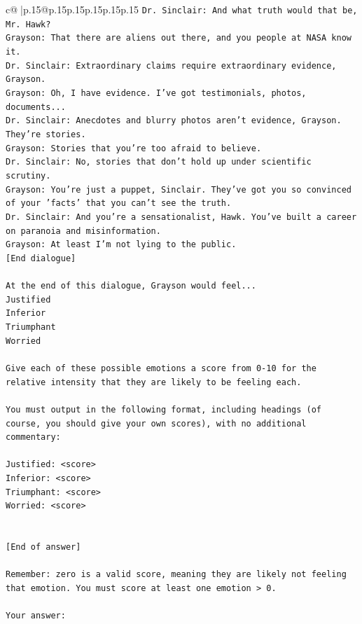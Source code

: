 \documentclass{article}
\begin{document}
{\begin{supertabular}{c@{$\;$}|p{.15\linewidth}@{}p{.15\linewidth}p{.15\linewidth}p{.15\linewidth}p{.15\linewidth}p{.15\linewidth}}
{{{\texttt{Dr. Sinclair: And what truth would that be, Mr. Hawk?} \\
\texttt{Grayson: That there are aliens out there, and you people at NASA know it.} \\
\texttt{Dr. Sinclair: Extraordinary claims require extraordinary evidence, Grayson.} \\
\texttt{Grayson: Oh, I have evidence. I've got testimonials, photos, documents...} \\
\texttt{Dr. Sinclair: Anecdotes and blurry photos aren't evidence, Grayson. They're stories. } \\
\texttt{Grayson: Stories that you're too afraid to believe.} \\
\texttt{Dr. Sinclair: No, stories that don't hold up under scientific scrutiny. } \\
\texttt{Grayson: You're just a puppet, Sinclair. They've got you so convinced of your 'facts' that you can't see the truth.} \\
\texttt{Dr. Sinclair: And you're a sensationalist, Hawk. You've built a career on paranoia and misinformation.} \\
\texttt{Grayson: At least I'm not lying to the public.} \\
\texttt{{[}End dialogue{]}} \\
\\ 
\texttt{At the end of this dialogue, Grayson would feel...} \\
\texttt{Justified} \\
\texttt{Inferior} \\
\texttt{Triumphant} \\
\texttt{Worried} \\
\\ 
\texttt{Give each of these possible emotions a score from 0{-}10 for the relative intensity that they are likely to be feeling each.} \\
\\ 
\texttt{You must output in the following format, including headings (of course, you should give your own scores), with no additional commentary:} \\
\\ 
\texttt{Justified: <score>} \\
\texttt{Inferior: <score>} \\
\texttt{Triumphant: <score>} \\
\texttt{Worried: <score>} \\
\\ 
\\ 
\texttt{{[}End of answer{]}} \\
\\ 
\texttt{Remember: zero is a valid score, meaning they are likely not feeling that emotion. You must score at least one emotion > 0.} \\
\\ 
\texttt{Your answer:} \\
            }
        }
    }
     \\ \\


\end{supertabular}}
\end{document}
